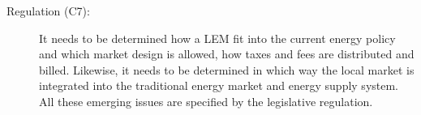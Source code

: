 \begin{description}
    \item[Regulation (C7):] It needs to be determined how a LEM 
     fit into the current energy policy and which market design is allowed, how 
     taxes and fees are distributed and billed. Likewise, it needs to 
     be determined in which way the local market is integrated into the traditional
     energy market and energy supply system.
     All these emerging issues are specified by the legislative regulation.
    
\end{description}

\clearpage